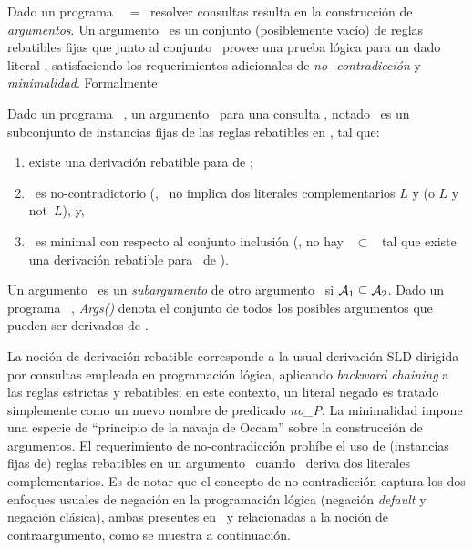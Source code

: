  Dado un programa \DLP\ \PP\ = \SD\, resolver consultas resulta en la
 construcción de \textit{argumentos}. Un argumento \ArgA\ es un
 conjunto (posiblemente vacío) de reglas rebatibles fijas que junto al
 conjunto \SSet\  provee una prueba lógica para un dado literal \ArgQ,
 satisfaciendo los requerimientos adicionales de  \textit{no-
 contradicción} y \textit{minimalidad}. Formalmente:
 
 \begin{definicion}[Argumento]
 \label{def:argumento}
 
 Dado un programa \DLP\ \PP, un argumento \ArgA\ para una consulta
 \ArgQ, notado \AQ\, es un subconjunto de  instancias fijas de las
 reglas rebatibles en \PP, tal que:
    
 \begin{enumerate}[(1)]
 \item existe una derivación rebatible para \ArgQ de \SyA;
 
 \item \SyA\ es no-contradictorio (\ie, \SyA\ no implica dos literales
 complementarios $L$ y  (o $L$ y \textsf{not}\ $L$), y,
 
 \item \ArgA\ es minimal con respecto al conjunto inclusión (\ie, no
 hay \Ap\ $\subset$ \ArgA\ tal que existe una derivación rebatible para
 \ArgQ\ de \SyAp).
 
 \end{enumerate}
 \end{definicion}

 Un argumento \AaQa\ es un \textit{subargumento} de otro argumento
 \AbQb\ si $\mbox{${\mathcal A_1}$} \subseteq \mbox{${\mathcal A_2}$}$. Dado un programa \DLP\ \PP,
 \textit{Args(\PP)} denota el conjunto de todos los posibles argumentos
 que  pueden ser derivados de \PP.

 La noción de derivación rebatible corresponde a la usual derivación
 SLD dirigida por consultas empleada en programación lógica, aplicando
 \textit{backward chaining} a las reglas estrictas y rebatibles; en
 este contexto, un literal negado  es tratado simplemente
 como un nuevo nombre de predicado \textit{no\_P}. La minimalidad
 impone una especie de ``principio de la navaja de Occam'' sobre la
 construcción  de argumentos. El requerimiento de no-contradicción
 prohíbe el uso de (instancias fijas de) reglas rebatibles en un
 argumento \ArgA\ cuando \SyA\ deriva dos literales complementarios. Es
 de notar que el concepto de no-contradicción captura los dos enfoques
 usuales de negación en la programación lógica (negación
 \textit{default} y negación clásica), ambas presentes en \DLP\ y
 relacionadas a la noción de contraargumento, como se muestra a
 continuación.
 
